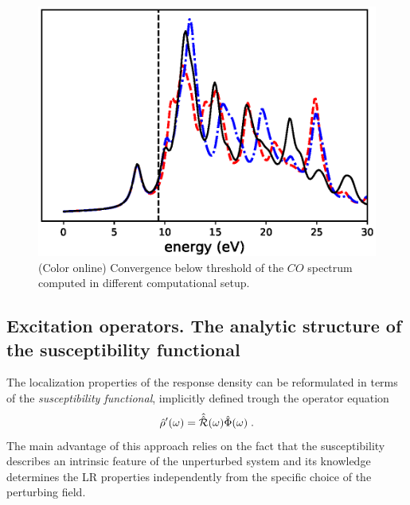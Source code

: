 \documentclass[reprint,aps,prb]{revtex4-1}
\newcommand{\be}{\begin{equation}}
\newcommand{\ee}{\end{equation}}
\newcommand{\lb}{\label}
\newcommand{\op}[1]{\hat {#1}}
\newcommand{\sop}[1]{\op{\op {#1}}}
\newcommand{\dm}{\op{\rho}}
\begin{document}

\begin{figure}
\includegraphics[scale=0.56]{co_spectrum.eps}
\caption{\label{co_spectrum}(Color online) Convergence below threshold of the $CO$ spectrum computed in different computational setup.}
\end{figure}


\subsection{Excitation operators. The analytic structure of the susceptibility functional} %

The localization properties of the response density can be reformulated in terms of the \emph{susceptibility functional}, implicitly defined trough the operator equation  
\be\lb{SusceptibilityDef1}
\dm'(\omega) = \sop{{\cal R}}(\omega) \op\Phi(\omega) \;. 
\ee
The main advantage of this approach relies on the fact that the susceptibility describes an intrinsic feature of the unperturbed system and its knowledge determines the LR properties 
independently from the specific choice of the perturbing field.
\end{document}
